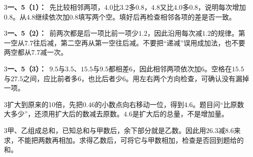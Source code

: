 \documentclass[multi=snippet,border={5bp 20bp 5bp 5bp}]{standalone}
\newenvironment{snippet}[3]{\begin{minipage}{#1bp}\color{answerred}\fontsize{#2}{#3}\selectfont\raggedright}{\end{minipage}}
\begin{document}
\begin{snippet}{505}{11.5}{14}\begin{multicols}{3}\raggedcolumns \textbf{一、5（1）：}\ 先比较相邻两项，\(4.0\)\allowbreak 比\(3.2\)\allowbreak 多\(0.8\)\allowbreak ，\(4.8\)\allowbreak 又比\(4.0\)\allowbreak 多\(0.8\)\allowbreak ，说明每次增加\(0.8\)\allowbreak 。从\(4.8\)\allowbreak 继续依次加\(0.8\)\allowbreak 填写两个空。填好后再检查相邻各项的差是否一致。\end{multicols}\end{snippet}
\begin{snippet}{505}{11.5}{14}\begin{multicols}{3}\raggedcolumns \textbf{一、5（2）：}\ 前两次都是后一项比前一项少\(1.2\)\allowbreak ，因此沿用每次减\(1.2\)\allowbreak 的规律。第一空从\(7.7\)\allowbreak 往后减，第二空再从第一空往后减。不要把“递减”误用成加法，也不要两空都从\(7.7\)\allowbreak 减一次。\end{multicols}\end{snippet}
\begin{snippet}{505}{11.5}{14}\begin{multicols}{3}\raggedcolumns \textbf{一、5（3）：}\ \(9.5\)\allowbreak 与\(3.5\)\allowbreak 、\(15.5\)\allowbreak 与\(9.5\)\allowbreak 都相差6，因此相邻两项依次加6。空格在\(15.5\)\allowbreak 与\(27.5\)\allowbreak 之间，应比前者多6，也比后者少6。用左右两个方向检查，可确认没有漏掉一项。\end{multicols}\end{snippet}
\begin{snippet}{505}{11.5}{14}\begin{multicols}{3}\raggedcolumns 扩大到原来的10倍，先把\(0.46\)\allowbreak 的小数点向右移动一位，得到\(4.6\)\allowbreak 。题目问“比原数大多少”，还须用扩大后的数减去原数。\(4.6\)\allowbreak 是扩大后的总量，不是增加量。\end{multicols}\end{snippet}
\begin{snippet}{505}{11.5}{14}\begin{multicols}{3}\raggedcolumns 甲、乙组成总和，已知总和与甲数后，余下部分就是乙数。因此用\(26.3\)\allowbreak 减\(8.6\)\allowbreak 来求，不能把两数再相加。求得乙数后，可将它与甲数相加，检查是否回到题给的和。\end{multicols}\end{snippet}
\end{document}
